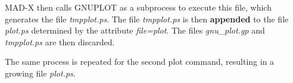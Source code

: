 MAD-X then calls GNUPLOT as a subprocess to execute this file, which
generates the file \textit{tmpplot.ps}.  
The file \textit{tmpplot.ps} is then {\bf appended} to the file
\textit{plot.ps} determined by the attribute \textit{file=plot}.  
The files \textit{gnu\_plot.gp} and \textit{tmpplot.ps} are then
discarded. 

The same process is repeated for the second plot command, resulting in a
growing file \textit{plot.ps}.




